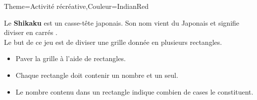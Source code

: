 \begin{Maquette}[Fiche,CorrigeFin,Colonnes=2]{}
\begin{multicols}{2}
   \end{multicols}

\end{Maquette}


\begin{Maquette}[Cours]{Theme={Activité récréative},Couleur={IndianRed}}
    
      Le {\bf Shikaku} est un casse-tête japonais. Son nom vient du Japonais et signifie \og diviser en carrés \fg. \\
      Le but de ce jeu est de diviser une grille donnée en plusieurs rectangles. \medskip
         
         \begin{itemize}
            \item Paver la grille à l'aide de rectangles.
            \item Chaque rectangle doit contenir un nombre et un seul.
            \item Le nombre contenu dans un rectangle indique combien de cases le constituent. \medskip
         \end{itemize}
   

\end{Maquette}

